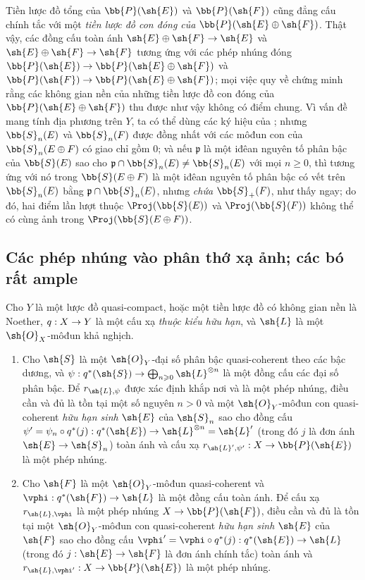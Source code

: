\documentclass[oneside,10pt]{amsart}
\makeatletter
\renewcommand{\geq}{\geqslant}
\newcommand{\ega@arrow}[2]{\mathchoice{#1}{#2}{#2}{#2}}
\renewcommand{\to}{\ega@arrow{\longrightarrow}{\rightarrow}}
\newcommand{\oldpage}[2][]{\marginnote{\normalfont\footnotesize\textbf{#1}~|~#2}\ignorespaces}
\let\EGAOriginalLabel\label
\renewcommand{\label}[1]{\phantomsection\EGAOriginalLabel{#1}}
\makeatother
\begin{document}
\begin{remark}[4.3.6]
\label{II.4.3.6}
Tiền lược đồ tổng của $\bb{P}(\sh{E})$ và $\bb{P}(\sh{F})$ cũng đẳng cấu chính tắc với một \emph{tiền lược đồ con đóng của $\bb{P}(\sh{E}\oplus\sh{F})$}.
Thật vậy, các đồng cấu toàn ánh $\sh{E}\oplus\sh{F}\to\sh{E}$ và $\sh{E}\oplus\sh{F}\to\sh{F}$ tương ứng với các phép nhúng đóng $\bb{P}(\sh{E})\to\bb{P}(\sh{E}\oplus\sh{F})$ và $\bb{P}(\sh{F})\to\bb{P}(\sh{E}\oplus\sh{F})$;
mọi việc quy về chứng minh rằng các không gian nền của những tiền lược đồ con đóng của $\bb{P}(\sh{E}\oplus\sh{F})$ thu được như vậy không có điểm chung.
Vì vấn đề mang tính địa phương trên $Y$, ta có thể dùng các ký hiệu của ;
nhưng $\bb{S}_n(E)$ và $\bb{S}_n(F)$ được đồng nhất với các môđun con của $\bb{S}_n(E\oplus F)$ có giao chỉ gồm $0$;
và nếu $\mathfrak{p}$ là một iđêan nguyên tố phân bậc của $\bb{S}(E)$ sao cho $\mathfrak{p}\cap\bb{S}_n(E)\neq\bb{S}_n(E)$ với mọi $n\geq0$, thì tương ứng với nó trong $\bb{S}(E\oplus F)$ là một iđêan nguyên tố phân bậc có vết trên $\bb{S}_n(E)$ bằng $\mathfrak{p}\cap\bb{S}_n(E)$, nhưng \emph{chứa} $\bb{S}_+(F)$, như thấy ngay;
do đó, hai điểm lần lượt thuộc $\Proj(\bb{S}(E))$ và $\Proj(\bb{S}(F))$ không thể có cùng ảnh trong $\Proj(\bb{S}(E\oplus F))$.
\end{remark}

\subsection{Các phép nhúng vào phân thớ xạ ảnh; các bó rất ample}
\label{subsection:II.4.4}

\begin{proposition}[4.4.1]
\label{II.4.4.1}
Cho $Y$ là một lược đồ quasi-compact, hoặc một tiền lược đồ có không gian nền là Noether, $q:X\to Y$ là một cấu xạ \emph{thuộc kiểu hữu hạn}, và $\sh{L}$ là một $\sh{O}_X$-môđun khả nghịch.
\begin{enumerate}
  \item[\rm{(i)}] Cho $\sh{S}$ là một $\sh{O}_Y$-đại số phân bậc quasi-coherent theo các bậc dương, và $\psi:q^*(\sh{S})\to\bigoplus_{n\geq0}\sh{L}^{\otimes n}$ là một đồng cấu các đại số phân bậc.
    Để $r_{\sh{L},\psi}$ được xác định khắp nơi và là một phép nhúng, điều cần và
\oldpage[II]{79}
đủ là tồn tại một số nguyên $n>0$ và một $\sh{O}_Y$-môđun con quasi-coherent \emph{hữu hạn sinh} $\sh{E}$ của $\sh{S}_n$ sao cho đồng cấu $\psi'=\psi_n\circ q^*(j):q^*(\sh{E})\to\sh{L}^{\otimes n}=\sh{L}'$ (trong đó $j$ là đơn ánh $\sh{E}\to\sh{S}_n$) toàn ánh và cấu xạ $r_{\sh{L}',\psi'}:X\to\bb{P}(\sh{E})$ là một phép nhúng.
  \item[\rm{(ii)}] Cho $\sh{F}$ là một $\sh{O}_Y$-môđun quasi-coherent và $\vphi:q^*(\sh{F})\to\sh{L}$ là một đồng cấu toàn ánh.
    Để cấu xạ $r_{\sh{L},\vphi}$ là một phép nhúng $X\to\bb{P}(\sh{F})$, điều cần và đủ là tồn tại một $\sh{O}_Y$-môđun con quasi-coherent \emph{hữu hạn sinh} $\sh{E}$ của $\sh{F}$ sao cho đồng cấu $\vphi'=\vphi\circ q^*(j):q^*(\sh{E})\to\sh{L}$ (trong đó $j:\sh{E}\to\sh{F}$ là đơn ánh chính tắc) toàn ánh và $r_{\sh{L},\vphi'}:X\to\bb{P}(\sh{E})$ là một phép nhúng.
\end{enumerate}
\end{proposition}
\end{document}
